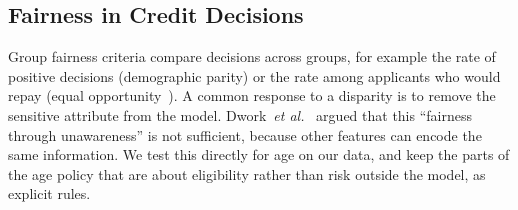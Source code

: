 \subsection{Fairness in Credit Decisions}
Group fairness criteria compare decisions across groups, for example the rate of positive decisions (demographic
parity) or the rate among applicants who would repay (equal opportunity~\cite{hardt2016equality}). A common response
to a disparity is to remove the sensitive attribute from the model. Dwork~\emph{et al.}~\cite{dwork2012awareness}
argued that this ``fairness through unawareness'' is not sufficient, because other features can encode the same
information. We test this directly for age on our data, and keep the parts of the age policy that are about
eligibility rather than risk outside the model, as explicit rules.
